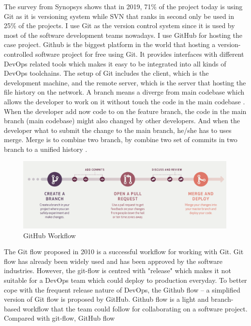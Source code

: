 The survey \cite{CompareR31:online} from Synopsys shows that in 2019, 71\% of the project today is using Git as it is versioning system while SVN that ranks in second only be used in 25\% of the projects. I use Git as the version control system since it is used by most of the software development teams nowadays. I use GitHub for hosting the case project. Github is the biggest platform in the world that hosting a version-controlled software project for free using Git. It provides interfaces with different DevOps related tools which makes it easy to be integrated into all kinds of DevOps toolchains. The setup of Git includes the client, which is the development machine, and the remote server, which is the server that hosting the file history on the network. A branch means a diverge from main codebase which allows the developer to work on it without touch the code in the main codebase \cite{GitBranc33:online}. When the developer add now code to on the feature branch, the code in the main branch (main codebase) might also changed by other developers. And when the developer what to submit the change to the main branch, he/she has to uses merge. Merge is to combine two branch, by combine two set of commits in two branch to a unified history \cite{GitMerge0:online}. 
\begin{figure}[h]
\centering
\includegraphics[width=0.99\textwidth]{pics/git.png}
\caption{GitHub Workflow \cite{guides2013understanding}}
\label{fig:git}
\end{figure}
\par
The Git flow \cite{driessen2010successful} proposed in 2010 is a successful workflow for working with Git. Git flow has already been widely used and has been approved by the software industries. However, the git-flow is centred with "release" which makes it not suitable for a DevOps team which could deploy to production everyday\cite{guides2013understanding}. To better cope with the frequent release nature of DevOps, the Github flow -- a simplified version of Git flow is proposed by GitHub. Github flow is a light and branch-based workflow that the team could follow for collaborating on a software project. Compared with git-flow, GitHub flow 

